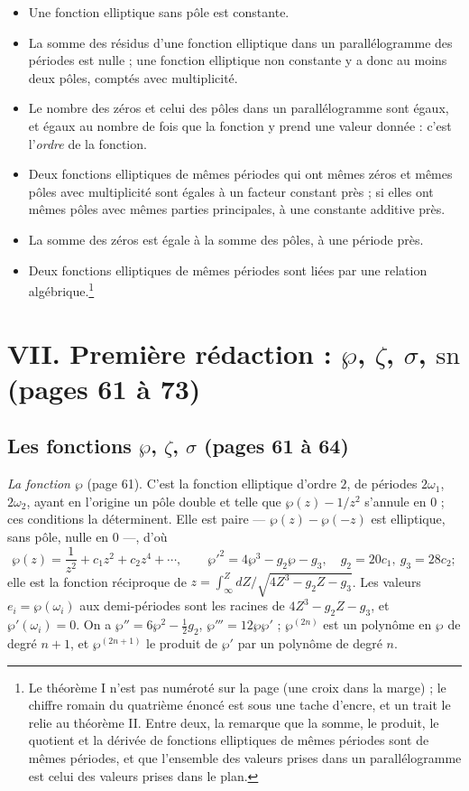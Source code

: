 \documentclass[11pt,a4paper]{article}
\begin{document}
\begin{itemize}
\item[I.] Une fonction elliptique sans pôle est constante.
\item[II.] La somme des résidus d'une fonction elliptique dans un
parallélogramme des périodes est nulle ; une fonction elliptique non constante y
a donc au moins deux pôles, comptés avec multiplicité.
\item[III.] Le nombre des zéros et celui des pôles dans un parallélogramme sont
égaux, et égaux au nombre de fois que la fonction y prend une valeur donnée :
c'est l'\emph{ordre} de la fonction.
\item[--] Deux fonctions elliptiques de mêmes périodes qui ont mêmes zéros et
mêmes pôles avec multiplicité sont égales à un facteur constant près ; si elles
ont mêmes pôles avec mêmes parties principales, à une constante additive près.
\item[IV.] La somme des zéros est égale à la somme des pôles, à une période près.
\item[V.] Deux fonctions elliptiques de mêmes périodes sont liées par une
relation algébrique.\footnote{Le théorème I n'est pas numéroté sur la page (une croix dans la
marge) ; le chiffre romain du quatrième énoncé est sous une tache d'encre, et un
trait le relie au théorème II. Entre deux, la remarque que la somme, le
produit, le quotient et la dérivée de fonctions elliptiques de mêmes périodes
sont de mêmes périodes, et que l'ensemble des valeurs prises dans un
parallélogramme est celui des valeurs prises dans le plan.}
\end{itemize}

\section*{VII. Première rédaction : $\wp$, $\zeta$, $\sigma$, $\mathrm{sn}$ (pages 61 à 73)}

\subsection*{Les fonctions $\wp$, $\zeta$, $\sigma$ (pages 61 à 64)}

\emph{La fonction $\wp$} (page 61). C'est la fonction elliptique d'ordre $2$,
de périodes $2\omega_1$, $2\omega_2$, ayant en l'origine un pôle double et
telle que $\wp(z) - 1/z^2$ s'annule en $0$ ; ces conditions la déterminent. Elle
est paire --- $\wp(z) - \wp(-z)$ est elliptique, sans pôle, nulle en $0$ ---,
d'où
\[
\wp(z) = \frac{1}{z^2} + c_1z^2 + c_2z^4 + \cdots, \qquad
\wp'^2 = 4\wp^3 - g_2\wp - g_3, \quad g_2 = 20c_1,\ g_3 = 28c_2 ;
\]
elle est la fonction réciproque de $z = \int_\infty^{Z} dZ/\sqrt{4Z^3 - g_2Z -
g_3}$. Les valeurs $e_i = \wp(\omega_i)$ aux demi-périodes sont les racines de
$4Z^3 - g_2Z - g_3$, et $\wp'(\omega_i) = 0$. On a $\wp'' = 6\wp^2 -
\frac12 g_2$, $\wp''' = 12\wp\wp'$ ; $\wp^{(2n)}$ est un polynôme en $\wp$ de
degré $n+1$, et $\wp^{(2n+1)}$ le produit de $\wp'$ par un polynôme de degré $n$.
\end{document}
